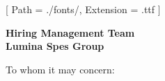 


\renewcommand{\photo}[2]{}

\geometry{
  left=2cm,
  right=2cm,
  top=2cm,
  bottom=2cm
}



\makecvheader

\setmainfont{NotoSans-Regular}[
  Path = ./fonts/,
  Extension = .ttf
]

\vspace{1cm}
\indent\textbf{Hiring Management Team}\\
\indent\textbf{Lumina Spes Group}

\vspace{0.5cm}

\noindent To whom it may concern:

\vspace{0.5cm}

